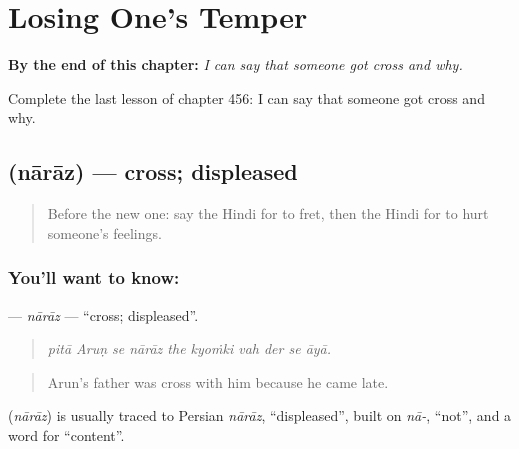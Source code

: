 
\chapter{Losing One's Temper}
\label{ch:hi-losing-one-s-temper}

\begin{chapteropening}
\textbf{By the end of this chapter:} \emph{I can say that someone got cross and why.}

Complete the last lesson of chapter 456: I can say that someone got cross and why.
\end{chapteropening}

\section[\texorpdfstring{\hi{नाराज़} (nārāz)}{नाराज़ (nārāz)}]{ (nārāz) — cross; displeased}

\label{lesson:HI-C456-naraz}



\begin{quote}
Before the new one: say the Hindi for to fret, then the Hindi for to hurt someone's feelings.
\end{quote}

\subsection*{You'll want to know: }
\textbf{} — \emph{nārāz} — \textquotedblleft{}cross; displeased\textquotedblright{}.

\begin{quote}
         
\end{quote}

\begin{quote}
\emph{pitā Aruṇ se nārāz the kyoṁki vah der se āyā.}
\end{quote}

\begin{quote}
Arun's father was cross with him because he came late.
\end{quote}

\begin{cousinweb}
\textbf{} (\emph{nārāz}) is usually traced to Persian \emph{nārāz}, \textquotedblleft{}displeased\textquotedblright{}, built on \emph{nā-}, \textquotedblleft{}not\textquotedblright{}, and a word for \textquotedblleft{}content\textquotedblright{}.
\end{cousinweb}

